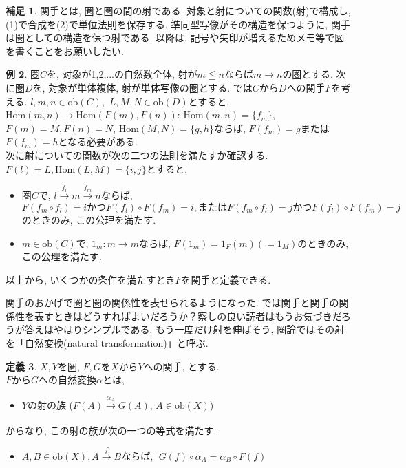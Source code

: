 \documentclass[a4paper]{jsarticle}
\theoremstyle{definition}
\newtheorem{dfn}{定義}[section]
\newtheorem{exam}[dfn]{例}
\newtheorem{hsk}[dfn]{補足}
\newcommand{\Hom}{{\mathrm{Hom}}}
\newcommand{\ob}{{\mathrm{ob}}}
\begin{document}
\begin{hsk}
    関手とは, 圏と圏の間の射である. 対象と射についての関数(射)で構成し, (1)で合成を(2)で単位法則を保存する. 準同型写像がその構造を保つように, 関手は圏としての構造を保つ射である. 以降は, 記号や矢印が増えるためメモ等で図を書くことをお願いしたい.\\
\end{hsk}
\begin{exam}
    圏$C$を, 対象が1,2,...の自然数全体, 射が$m\leqq n$ならば$m \rightarrow n$の圏とする. 次に圏$D$を, 対象が単体複体, 射が単体写像の圏とする. では$C$から$D$への関手$F$を考える. $l, m, n\in\ob (C), $ $ L, M, N\in\ob(D)$とすると,\\ 
    $\Hom (m, n)\rightarrow \Hom (F(m), F(n))$: $\Hom (m, n)=\{f_m\}$, $F(m)=M, F(n)=N$, $\Hom (M, N)=\{g, h\}$ならば, $F(f_m)=g$または$F(f_m)=h$となる必要がある.\\
    次に射についての関数が次の二つの法則を満たすか確認する.\\
    $F(l)=L, \Hom (L, M)=\{i,j\}$とすると, 
    
    \begin{itemize}
        \item[(1)] 圏$C$で, $l\stackrel{f_l}{\to} m\stackrel{f_m}{\to} n$ならば, $F(f_m\circ f_l) =i かつ F(f_l)\circ F(f_m) = i, またはF(f_m\circ f_l) =j かつ F(f_l)\circ F(f_m) = j$のときのみ, この公理を満たす.
        \item [(2)] $m\in$ob$(C)$で, $1_m:m\rightarrow m$ならば, $F(1_m) = 1_F(m)(=1_M)$のときのみ, この公理を満たす.
    \end{itemize}
    以上から, いくつかの条件を満たすとき$F$を関手と定義できる.\\
\end{exam}
関手のおかげで圏と圏の関係性を表せられるようになった. では関手と関手の関係性を表すときはどうすればよいだろうか？察しの良い読者はもうお気づきだろうが答えはやはりシンプルである. もう一度だけ射を伸ばそう, 圏論ではその射を「自然変換(natural transformation)」と呼ぶ.
\begin{dfn}
    $X, Y$を圏, $F, G$を$X$から$Y$への関手, とする.\\
    $F$から$G$への自然変換$\alpha$とは,
    \begin{itemize}
        \item $Y$の射の族 ($F(A)\xrightarrow[]{\alpha_A} G(A)$, $A\in\ob(X)$)
    \end{itemize}
    からなり, この射の族が次の一つの等式を満たす.
    \begin{itemize}
        \item $A, B\in\ob(X), A\xrightarrow[]{f}B$ならば, $\; G(f)\circ \alpha_A = \alpha_B\circ F(f)$
    \end{itemize}
\end{dfn}
\end{document}

